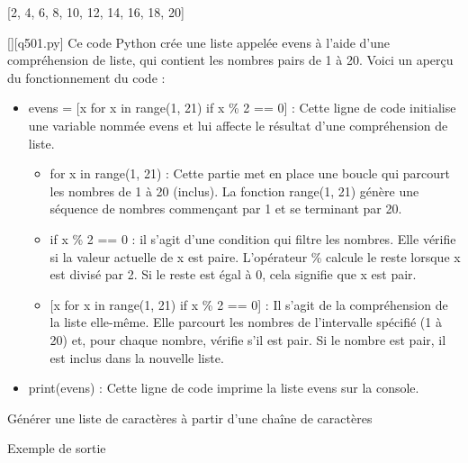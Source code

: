 [2, 4, 6, 8, 10, 12, 14, 16, 18, 20]
        \par
        \begin{solution}
            \renewcommand{\nomfichier}{q501.py}
            \pythonfile{\chemincode \nomfichier}[][\nomfichier]
            Ce code Python crée une liste appelée evens à l'aide d'une compréhension de liste, qui contient les nombres pairs de 1 à 20. Voici un aperçu du fonctionnement du code :\par

\begin{itemize}
\item     evens = [x for x in range(1, 21) if x \% 2 == 0] : Cette ligne de code initialise une variable nommée evens et lui affecte le résultat d'une compréhension de liste.

 \begin{itemize}
 \item        for x in range(1, 21) : Cette partie met en place une boucle qui parcourt les nombres de 1 à 20 (inclus). La fonction range(1, 21) génère une séquence de nombres commençant par 1 et se terminant par 20.
 \item         if x \% 2 == 0 : il s'agit d'une condition qui filtre les nombres. Elle vérifie si la valeur actuelle de x est paire. L'opérateur \% calcule le reste lorsque x est divisé par 2. Si le reste est égal à 0, cela signifie que x est pair.
 \item{}         [x for x in range(1, 21) if x \% 2 == 0] : Il s'agit de la compréhension de la liste elle-même. Elle parcourt les nombres de l'intervalle spécifié (1 à 20) et, pour chaque nombre, vérifie s'il est pair. Si le nombre est pair, il est inclus dans la nouvelle liste.
 \end{itemize}
   \item print(evens) : Cette ligne de code imprime la liste evens sur la console.
\end{itemize}
        \end{solution}
        

        \question
        Générer une liste de caractères à partir d'une chaîne de caractères

Exemple de sortie

